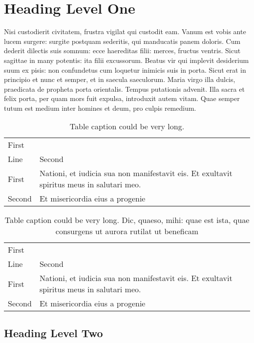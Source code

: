 \documentclass[pdftex,crc]{ios-book}
\begin{document}
\section{Heading Level One}

Nisi custodierit civitatem, frustra vigilat qui custodit eam. Vanum
est vobis ante lucem surgere: surgite postquam sederitis, qui
manducatis panem doloris. Cum dederit dilectis suis somnum: ecce
haereditas filii: merces, fructus ventris. Sicut sagittae in many
potentis: ita filii excussorum. Beatus vir qui implevit desiderium
suum ex pisis: non confundetus cum loquetur inimicis suis in porta.
Sicut erat in principio et nunc et semper, et in saecula saeculorum.
Maria virgo illa dulcis, praedicata de propheta porta orientalis.
Tempus putationis advenit.  Illa sacra et felix porta, per quam mors
fuit expulsa, introduxit autem vitam.  Quae semper tutum est medium
inter homines et deum, pro culpis remedium.

\begin{table}[t]
\caption{Table caption could be very long.}
\begin{tabular}{lp{5.3cm}}
\hline
First &       \\ Line  & Second \\ \hline First  &
Nationi, et iudicia sua non manifestavit eis. Et exultavit
spiritus meus
                    in salutari meo.\\
Second & Et misericordia eius a progenie\\
\hline
\end{tabular}
\end{table}


\begin{table}[t]
\caption{Table caption could be very long.
Dic, quaeso, mihi: quae est ista, quae consurgens ut aurora rutilat
ut beneficam}
\begin{tabular*}{\textwidth}{lp{10.7cm}}
\hline
First &       \\ Line  & Second \\ \hline First  &
Nationi, et iudicia sua non manifestavit eis. Et exultavit
spiritus meus
                    in salutari meo.\\
Second & Et misericordia eius a progenie\\
\hline
\end{tabular*}
\end{table}

\subsection{Heading Level Two}
\end{document}
